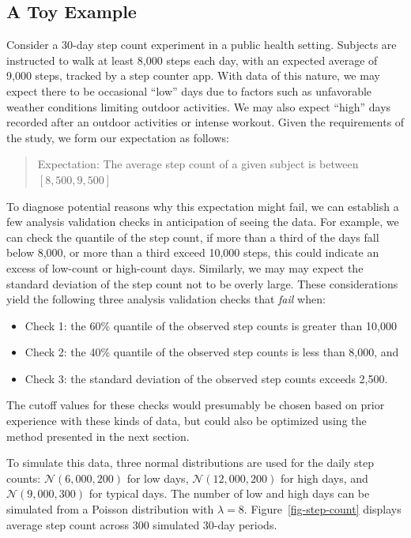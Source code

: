 \documentclass[
  12pt,
]{interact}
\providecommand{\tightlist}{%
  \setlength{\itemsep}{0pt}\setlength{\parskip}{0pt}}\usepackage{longtable,booktabs,array}
\begin{document}
\subsection{A Toy Example}\label{sec-toy}

Consider a 30-day step count experiment in a public health setting.
Subjects are instructed to walk at least 8,000 steps each day, with an
expected average of 9,000 steps, tracked by a step counter app. With
data of this nature, we may expect there to be occasional ``low'' days
due to factors such as unfavorable weather conditions limiting outdoor
activities. We may also expect ``high'' days recorded after an outdoor
activities or intense workout. Given the requirements of the study, we
form our expectation as follows:

\begin{quote}
Expectation: The average step count of a given subject is between
\([8,500, 9,500]\)
\end{quote}

To diagnose potential reasons why this expectation might fail, we can
establish a few analysis validation checks in anticipation of seeing the
data. For example, we can check the quantile of the step count, if more
than a third of the days fall below 8,000, or more than a third exceed
10,000 steps, this could indicate an excess of low-count or high-count
days. Similarly, we may may expect the standard deviation of the step
count not to be overly large. These considerations yield the following
three analysis validation checks that \emph{fail} when:

\begin{itemize}
\tightlist
\item
  Check 1: the 60\% quantile of the observed step counts is greater than
  10,000
\item
  Check 2: the 40\% quantile of the observed step counts is less than
  8,000, and
\item
  Check 3: the standard deviation of the observed step counts exceeds
  2,500.
\end{itemize}

The cutoff values for these checks would presumably be chosen based on
prior experience with these kinds of data, but could also be optimized
using the method presented in the next section.

To simulate this data, three normal distributions are used for the daily
step counts: \(\mathcal{N}(6,000, 200)\) for low days,
\(\mathcal{N}(12,000, 200)\) for high days, and
\(\mathcal{N}(9,000, 300)\) for typical days. The number of low and high
days can be simulated from a Poisson distribution with \(\lambda = 8\).
Figure~\ref{fig-step-count} displays average step count across 300
simulated 30-day periods.
\end{document}
